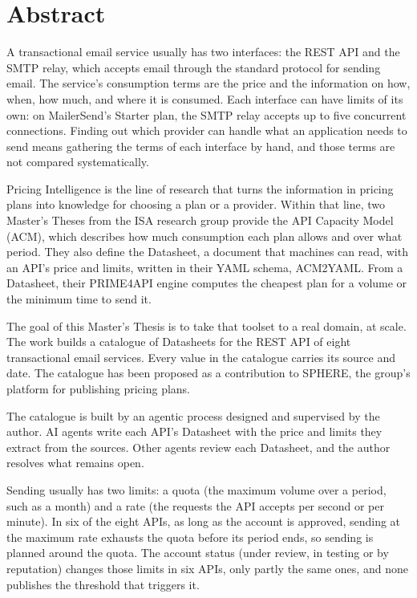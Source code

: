 \chapter*{Abstract}
A transactional email service usually has two interfaces: the REST API and the SMTP relay,
which accepts email through the standard protocol for sending email. The service's
consumption terms are the price and the information on how, when, how much, and where it is
consumed. Each interface can have limits of its own: on MailerSend's Starter plan,
the SMTP relay accepts up to five concurrent connections. Finding out which provider can handle what an
application needs to send means gathering the terms of each interface by hand, and those terms
are not compared systematically.

Pricing Intelligence is the line of research that turns the information in pricing plans into
knowledge for choosing a plan or a provider. Within that line, two Master's Theses from the
ISA research group provide the API Capacity Model (ACM), which describes how much consumption
each plan allows and over what period. They also define the Datasheet, a document that machines
can read, with an API's price and limits, written in their YAML schema, ACM2YAML. From a
Datasheet, their PRIME4API engine computes the cheapest plan for a volume or the minimum time to send
it.

The goal of this Master's Thesis is to take that toolset to a real domain, at scale. The work
builds a catalogue of Datasheets for the REST API of eight transactional email services. Every
value in the catalogue carries its source and date. The catalogue has been proposed as a
contribution to SPHERE, the group's platform for publishing
pricing plans.

The catalogue is built by an agentic process designed and supervised by the author. AI agents
write each API's Datasheet with the price and limits they extract from the sources. Other agents review each Datasheet,
and the author resolves what remains open.

Sending usually has two limits: a quota (the maximum volume over a period, such as a month)
and a rate (the requests the API accepts per second or per minute). In six of the
eight APIs, as long as the account is approved, sending at the maximum rate exhausts the quota
before its period ends, so sending is planned around the quota. The account status (under
review, in testing or by reputation) changes those limits in six APIs, only partly the same ones, and
none publishes the threshold that triggers it.

